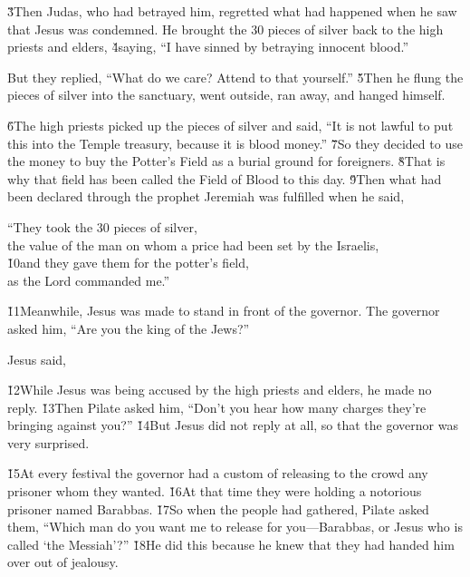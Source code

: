 \v{3}Then Judas, who had betrayed him, regretted what had happened when he saw that Jesus was condemned. He brought the 30 pieces of silver back to the high priests and elders, \v{4}saying, ``I have sinned by betraying innocent blood.''

But they replied, ``What do we care? Attend to that yourself.'' \v{5}Then he flung the pieces of silver into the sanctuary, went outside, ran away, and hanged himself.

\v{6}The high priests picked up the pieces of silver and said, ``It is not lawful to put this into the Temple treasury, because it is blood money.'' \v{7}So they decided to use the money to buy the Potter's Field as a burial ground for foreigners. \v{8}That is why that field has been called the Field of Blood to this day. \v{9}Then what had been declared through the prophet Jeremiah was fulfilled when he said,

\begin{poetry}
\poeml ``They took the 30 pieces of silver, \\
\poemll    the value of the man on whom a price had been set by the Israelis, \\
\poeml \v{10}and they gave them for the potter's field, \\
\poemll    as the Lord commanded me.''
\end{poetry}

\v{11}Meanwhile, Jesus was made to stand in front of the governor. The governor asked him, ``Are you the king of the Jews?''

Jesus said, 

\v{12}While Jesus was being accused by the high priests and elders, he made no reply. \v{13}Then Pilate asked him, ``Don't you hear how many charges they're bringing against you?'' \v{14}But Jesus did not reply at all, so that the governor was very surprised.

\v{15}At every festival the governor had a custom of releasing to the crowd any prisoner whom they wanted. \v{16}At that time they were holding a notorious prisoner named Barabbas. \v{17}So when the people had gathered, Pilate asked them, ``Which man do you want me to release for you---Barabbas, or Jesus who is called `the Messiah'?'' \v{18}He did this because he knew that they had handed him over out of jealousy.

